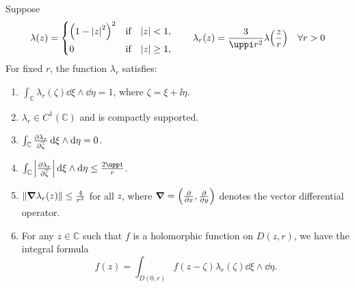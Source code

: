 \begin{proposition}\label{prop:diracdeltaapproximation}
    Suppose
    \begin{equation}
        \lambda(z)=
        \begin{dcases}
            \qty(1-\abs{z}^2)^2 & \qif*\abs{z}<1,   \\
            0                   & \qif*\abs{z}\ge1,
        \end{dcases}\qquad\lambda_r(z)=\frac{3}{\uppi r^2}\lambda\qty(\frac{z}{r})\quad\forall r>0\label{eq:diracdeltaapproximation_lambdadefinition}
    \end{equation}
    For fixed \(r\), the function \(\lambda_r\) satisfies:
    \begin{enumerate}
        \item \(\int_{\mathbb{C}}\lambda_r(\zeta)\dd{\xi}\wedge\dd{\eta}=1\), where \(\zeta=\xi+\ii\eta\).\label{itm:diracdeltaapproximation_integralto1}
        \item \(\lambda_r\in C^1(\mathbb{C})\) and is compactly supported.\label{itm:diracdeltaapproximation_compactsupportcontinuousdifferentiability}
        \item \(\int_{\mathbb{C}}\pdv{\lambda_r}{\overline{\zeta}}\dd{\xi}\wedge\dd{\eta}=0\).\label{itm:diracdeltaapproximation_antiholomorphicderivativeintegral}
        \item \(\int_{\mathbb{C}}\abs{\pdv{\lambda_r}{\overline{\zeta}}}\dd{\xi}\wedge\dd{\eta}\leq\frac{2\uppi}{r}\).\label{itm:diracdeltaapproximation_absoluteantiholomorphicderivativeintegral}
        \item \(\norm{\grad{\lambda_r(z)}}\leq\frac4{r^3}\) for all \(z\), where \(\grad=\qty(\pdv{}{x},\pdv{}{y})\) denotes the vector differential operator.\label{itm:diracdeltaapproximation_gradientstatement}
        \item\label{itm:diracdeltaapproximation_integralformula} For any \(z\in\mathbb{C}\) such that \(f\) is a holomorphic function on \(D(z,r)\), we have the integral formula
            \begin{equation}
                f(z)=\int_{D(0,r)}f(z-\zeta)\lambda_r(\zeta)\dd{\xi}\wedge\dd{\eta}.\label{eq:diracdeltaapproximation_integralformula}
            \end{equation}
    \end{enumerate}
\end{proposition}
